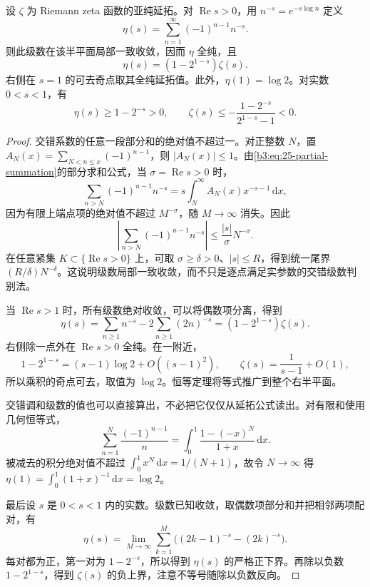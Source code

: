 \begin{proposition}[交错级数及其全纯性]\label{b3:prop:26-eta-holomorphic}
设 \(\zeta\) 为 Riemann zeta 函数的亚纯延拓。对 \(\operatorname{Re}s>0\)，用 \(n^{-s}=e^{-s\log n}\) 定义
\[
 \eta(s)=\sum_{n=1}^{\infty}(-1)^{n-1}n^{-s}.
\]
则此级数在该半平面局部一致收敛，因而 \(\eta\) 全纯，且
\begin{equation}\label{b3:eq:26-eta-zeta}
 \eta(s)=(1-2^{1-s})\zeta(s).
\end{equation}
右侧在 \(s=1\) 的可去奇点取其全纯延拓值。此外，\(\eta(1)=\log2\)。对实数 \(0<s<1\)，有
\begin{equation}\label{b3:eq:26-real-strip-sign}
 \eta(s)\ge1-2^{-s}>0,\qquad
 \zeta(s)\le-\frac{1-2^{-s}}{2^{1-s}-1}<0.
\end{equation}
\end{proposition}
\begin{proof}
交错系数的任意一段部分和的绝对值不超过一。对正整数 \(N\)，置
\(A_N(x)=\sum_{N<n\le x}(-1)^{n-1}\)，则 \(|A_N(x)|\le1\)。由\eqref{b3:eq:25-partial-summation}的部分求和公式，当 \(\sigma=\operatorname{Re}s>0\) 时，
\[
 \sum_{n>N}(-1)^{n-1}n^{-s}
 =s\int_N^\infty A_N(x)x^{-s-1}\,\mathrm dx,
\]
因为有限上端点项的绝对值不超过 \(M^{-\sigma}\)，随 \(M\to\infty\) 消失。因此
\[
 \left|\sum_{n>N}(-1)^{n-1}n^{-s}\right|
 \le\frac{|s|}{\sigma}N^{-\sigma}.
\]
在任意紧集 \(K\subset\{\operatorname{Re}s>0\}\) 上，可取 \(\sigma\ge\delta>0\)、\(|s|\le R\)，得到统一尾界 \((R/\delta)N^{-\delta}\)。这说明级数局部一致收敛，而不只是逐点满足实参数的交错级数判别法。

当 \(\operatorname{Re}s>1\) 时，所有级数绝对收敛，可以将偶数项分离，得到
\[
 \eta(s)=\sum_{n\ge1}n^{-s}
       -2\sum_{n\ge1}(2n)^{-s}
       =(1-2^{1-s})\zeta(s).
\]
右侧除一点外在 \(\operatorname{Re}s>0\) 全纯。在一附近，
\[
 1-2^{1-s}=(s-1)\log2+O((s-1)^2),\qquad
 \zeta(s)=\frac1{s-1}+O(1),
\]
所以乘积的奇点可去，取值为 \(\log2\)。恒等定理将等式推广到整个右半平面。

交错调和级数的值也可以直接算出，不必把它仅仅从延拓公式读出。对有限和使用几何恒等式，
\[
 \sum_{n=1}^{N}\frac{(-1)^{n-1}}n
 =\int_0^1\frac{1-(-x)^N}{1+x}\,\mathrm dx.
\]
被减去的积分绝对值不超过 \(\int_0^1x^N\,\mathrm dx=1/(N+1)\)，故令 \(N\to\infty\) 得
\(\eta(1)=\int_0^1(1+x)^{-1}\,\mathrm dx=\log2\)。

最后设 \(s\) 是 \(0<s<1\) 内的实数。级数已知收敛，取偶数项部分和并把相邻两项配对，有
\[
 \eta(s)
 =\lim_{M\to\infty}\sum_{k=1}^M
   \bigl((2k-1)^{-s}-(2k)^{-s}\bigr).
\]
每对都为正，第一对为 \(1-2^{-s}\)，所以得到 \(\eta(s)\) 的严格正下界。再除以负数 \(1-2^{1-s}\)，得到 \(\zeta(s)\) 的负上界，注意不等号随除以负数反向。
\end{proof}

